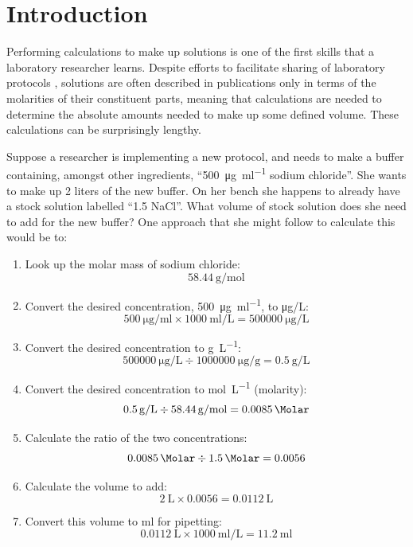 \documentclass[times, twoside]{zHenriquesLab-StyleBioRxiv}
\begin{document}
\section*{Introduction}
Performing calculations to make up solutions is one of the first skills that a laboratory researcher learns. Despite efforts to facilitate sharing of laboratory protocols \cite{TeytelmanStoliartchouk2015}, solutions are often described in publications only in terms of the molarities of their constituent parts, meaning that calculations are needed to determine the absolute amounts needed to make up some defined volume.  These calculations can be surprisingly lengthy.

Suppose a researcher is implementing a new protocol, and needs to make a buffer containing, amongst other ingredients, ``\SI[per-mode=symbol]{500}{\ug\per\ml} sodium chloride''. She wants to make up 2 liters of the new buffer. On her bench she happens to already have a stock solution labelled ``\SI{1.5}{\Molar} NaCl''. What volume of stock solution does she need to add for the new buffer? One approach that she might follow to calculate this would be to:
\begin{enumerate}
    \item Look up the molar mass of sodium chloride: $$\SI[per-mode=symbol]{58.44}{\g\per\mol}$$
    \item Convert the desired concentration, \SI[per-mode=symbol]{500}{\ug\per\ml}, to \si[per-mode=symbol]{\ug\per\liter}: $$\SI[per-mode=symbol]{500}{\ug\per\ml} \times \SI{1000}{\ml\per\liter} = \SI{500000}{\ug\per\liter} $$
   \item  Convert the desired concentration to \si{\g\per\liter}:  $$ \SI{500000}{\ug\per\liter} \div \SI{1000000}{\ug\per\gram} = \SI{0.5}{\g\per\liter} $$ 
 \item Convert the desired concentration to \si{\mol\per\liter} (molarity): 
 $$ \SI{0.5}{\g\per\liter} \div \SI{58.44}{\g\per\mol} = \SI{0.0085}{\Molar} $$ 
 \item Calculate the ratio of the two concentrations:
  $$ \SI{0.0085}{\Molar} \div \SI{1.5}{\Molar} = \num{0.0056} $$ 
 \item Calculate the volume to add:
 $$ \SI{2}{\liter} \times \num{0.0056} = \SI{0.0112}{\liter} $$ 
 \item Convert this volume to  \si{\ml} for pipetting:
  $$ \SI{0.0112}{\liter} \times \SI{1000}{\ml\per\liter} = \SI{11.2}{\ml} $$ 
\end{enumerate}
\end{document}
